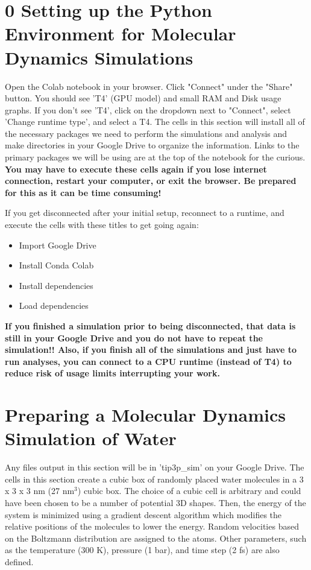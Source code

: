\documentclass{article}
\begin{document}
\section*{0 \hspace*{0.15cm} Setting up the Python Environment for Molecular Dynamics Simulations}

Open the Colab notebook in your browser. Click "Connect" under the "Share" button. You should see 'T4' (GPU model) and small RAM and Disk usage graphs. If you don't see 'T4', click on the dropdown next to "Connect", select 'Change runtime type', and select a T4. The cells in this section will install all of the necessary packages we need to perform the simulations and analysis and make directories in your Google Drive to organize the information. Links to the primary packages we will be using are at the top of the notebook for the curious. \textbf{You may have to execute these cells again if you lose internet connection, restart your computer, or exit the browser. Be prepared for this as it can be time consuming!} 

If you get disconnected after your initial setup, reconnect to a runtime, and execute the cells with these titles to get going again:

\begin{itemize}
    \item Import Google Drive
    \item Install Conda Colab
    \item Install dependencies
    \item Load dependencies
\end{itemize}

\textbf{If you finished a simulation prior to being disconnected, that data is still in your Google Drive and you do not have to repeat the simulation!! Also, if you finish all of the simulations and just have to run analyses, you can connect to a CPU runtime (instead of T4) to reduce risk of usage limits interrupting your work.}

\section{Preparing a Molecular Dynamics Simulation of Water}

Any files output in this section will be in 'tip3p\_sim' on your Google Drive. The cells in this section create a cubic box of randomly placed water molecules in a 3 x 3 x 3 nm (27 nm$^3$) cubic box. The choice of a cubic cell is arbitrary and could have been chosen to be a number of potential 3D shapes. Then, the energy of the system is minimized using a gradient descent algorithm which modifies the relative positions of the molecules to lower the energy. Random velocities based on the Boltzmann distribution are assigned to the atoms. Other parameters, such as the temperature (300 K), pressure (1 bar), and time step (2 fs) are also defined.
\end{document}
